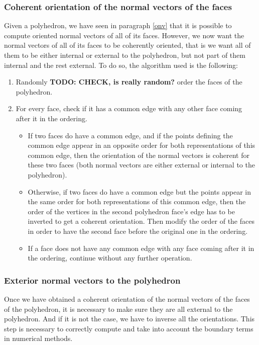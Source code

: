 \subsubsection{Coherent orientation of the normal vectors of the faces}
Given a polyhedron, we have seen in paragraph \ref{onv} that it is possible to compute oriented normal vectors of all of its faces. However, we now want the normal vectors of all of its faces to be coherently oriented, that is we want all of them to be either internal or external to the polyhedron, but not part of them internal and the rest external. To do so, the algorithm used is the following:
\begin{enumerate}
\item Randomly \textbf{TODO: CHECK, is really random?} order the faces of the polyhedron. 
\item For every face, check if it has a common edge with any other face coming after it in the ordering.
\begin{itemize}
	\item If two faces do have a common edge, and if the points defining the common edge appear in an opposite order for both representations of this common edge, then the orientation of the normal vectors is coherent for these two faces (both normal vectors are either external or internal to the polyhedron). 
	\item Otherwise, if two faces do have a common edge but the points appear in the same order for both representations of this common edge, then the order of the vertices in the second polyhedron face's edge has to be inverted to get a coherent orientation. Then modify the order of the faces in order to have the second face before the original one in the ordering. 
	\item If a face does not have any common edge with any face coming after it in the ordering, continue without any further operation.
\end{itemize}
\end{enumerate}

\subsubsection{Exterior normal vectors to the polyhedron}
Once we have obtained a coherent orientation of the normal vectors of the faces of the polyhedron, it is necessary to make sure they are all external to the polyhedron. And if it is not the case, we have to inverse all the orientations. This step is necessary to correctly compute and take into account the boundary terms in numerical methods. 

